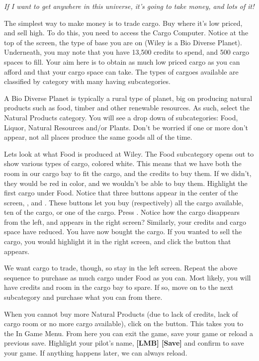 \documentclass{article}
\newcommand{\key}[1]{%
  \tikz[baseline=(key.base)]{
    \node[draw=gray!50, fill=gray!5, rounded corners=2pt, inner sep=2pt, minimum height=1.5ex] (key) {\footnotesize\sffamily\bfseries #1};
  }%
}
\begin{document}
\textit{If I want to get anywhere in this universe, it's going to take money, and lots of it! }

The simplest way to make money is to trade cargo.  Buy where it's low priced, and sell high.  To do this, you need to access the Cargo Computer. Notice at the top of the screen, the type of base you are on (Wiley is a Bio Diverse Planet). Underneath, you may note that you have 13,500 credits to spend, and 500 cargo spaces to fill. Your aim here is to obtain as much low priced cargo as you can afford and that your cargo space can take. The types of cargoes available are classified by category with many having subcategories. 

A Bio Diverse Planet is typically a rural type of planet, big on producing natural products such as food, timber and other renewable resources. As such, select the Natural Products category. You will see a drop down of subcategories: Food, Liquor, Natural Resources and/or Plants. Don't be worried if one or more don't appear, not all places produce the same goods all of the time. 

Lets look at what Food is produced at Wiley. The Food subcategory opens out to show various types of cargo, colored white. This means that we have both the room in our cargo bay to fit the cargo, and the credits to buy them. If we didn't, they would be red in color, and we wouldn't be able to buy them.  Highlight the first cargo under Food. Notice that three buttons appear in the center of the screen, \key{Buy}, \key{Buy 10} and \key{Buy 1}. These buttons let you buy (respectively) all the cargo available, ten of the cargo, or one of the cargo. Press \key{Buy}. Notice how the cargo disappears from the left, and appears in the right screen? Similarly, your credits and cargo space have reduced. You have now bought the cargo. If you wanted to sell the cargo, you would highlight it in the right screen, and click the \key{Sell} button that appears. 



We want cargo to trade, though, so stay in the left screen. Repeat the above sequence to purchase as much cargo under Food as you can. Most likely, you will have credits and room in the cargo bay to spare. If so, move on to the next subcategory and purchase what you can from there. 

When you cannot buy more Natural Products (due to lack of credits, lack of cargo room or no more cargo available), click on the \key{Save/Load} button. This takes you to the In Game Menu. From here you can exit the game, save your game or reload a previous save. Highlight your pilot's name, \textbf{[LMB] [Save] } and confirm to save your game. If anything happens later, we can always reload. 
\end{document}
